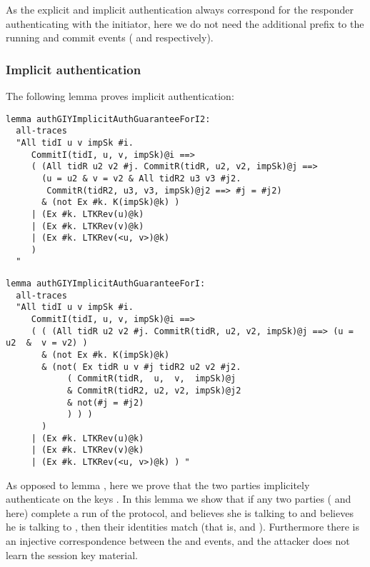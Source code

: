 As the explicit and implicit authentication always correspond for the
responder authenticating with the initiator, here we do not need the
additional  prefix to the running and commit events
( and  respectively).

\subsubsection{Implicit authentication}

The following lemma proves implicit authentication:
\begin{lstlisting}
lemma authGIYImplicitAuthGuaranteeForI2:
  all-traces
  "All tidI u v impSk #i.
     CommitI(tidI, u, v, impSk)@i ==>
     ( (All tidR u2 v2 #j. CommitR(tidR, u2, v2, impSk)@j ==>
       (u = u2 & v = v2 & All tidR2 u3 v3 #j2.
	    CommitR(tidR2, u3, v3, impSk)@j2 ==> #j = #j2)
       & (not Ex #k. K(impSk)@k) )
     | (Ex #k. LTKRev(u)@k)
     | (Ex #k. LTKRev(v)@k)
     | (Ex #k. LTKRev(<u, v>)@k)
     )
  "
\end{lstlisting}
\begin{lstlisting}
lemma authGIYImplicitAuthGuaranteeForI:
  all-traces
  "All tidI u v impSk #i.
     CommitI(tidI, u, v, impSk)@i ==>
     ( ( (All tidR u2 v2 #j. CommitR(tidR, u2, v2, impSk)@j ==> (u = u2  &  v = v2) )
       & (not Ex #k. K(impSk)@k)
       & (not( Ex tidR u v #j tidR2 u2 v2 #j2.
            ( CommitR(tidR,  u,  v,  impSk)@j
            & CommitR(tidR2, u2, v2, impSk)@j2
            & not(#j = #j2)
            ) ) )
       )
     | (Ex #k. LTKRev(u)@k)
     | (Ex #k. LTKRev(v)@k)
     | (Ex #k. LTKRev(<u, v>)@k) ) "
\end{lstlisting}

As opposed to lemma , here we prove that the two
parties implicitely authenticate on the keys . %
In this lemma we show that if any two parties ( and  here) complete
a run of the protocol, and  believes she is talking to  and 
believes he is talking to , then their identities match (that is, %
 and ). Furthermore there is an injective correspondence
between the  and  events, and the attacker does not
learn the session key material.

